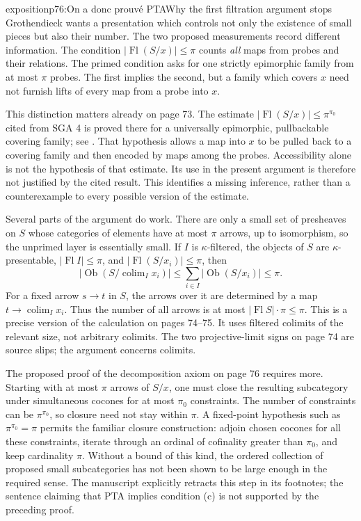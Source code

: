 \begin{dcomment}{exposition}{p76:On a donc prouvé PTA}{Why the first filtration argument stops}
Grothendieck wants a presentation which controls not only the existence of small pieces but also their number.  The two proposed measurements record different information.  The condition $|\operatorname{Fl}(S/x)|\leq\pi$ counts \emph{all} maps from probes and their relations.  The primed condition asks for one strictly epimorphic family from at most $\pi$ probes.  The first implies the second, but a family which covers $x$ need not furnish lifts of every map from a probe into $x$.

This distinction matters already on page 73.  The estimate $|\operatorname{Fl}(S/x)|\leq\pi^{\pi_0}$ cited from SGA 4 is proved there for a universally epimorphic, pullbackable covering family; see \citet[Expos\'e I, Proposition 7.6 and Proposition 9.13]{SGA4I1972}.  That hypothesis allows a map into $x$ to be pulled back to a covering family and then encoded by maps among the probes.  Accessibility alone is not the hypothesis of that estimate.  Its use in the present argument is therefore not justified by the cited result.  This identifies a missing inference, rather than a counterexample to every possible version of the estimate.

Several parts of the argument do work.  There are only a small set of presheaves on $S$ whose categories of elements have at most $\pi$ arrows, up to isomorphism, so the unprimed layer is essentially small.  If $I$ is $\kappa$-filtered, the objects of $S$ are $\kappa$-presentable, $|\operatorname{Fl}I|\leq\pi$, and $|\operatorname{Fl}(S/x_i)|\leq\pi$, then
\[
 |\operatorname{Ob}(S/\operatorname{colim}_I x_i)|
 \leq\sum_{i\in I}|\operatorname{Ob}(S/x_i)|\leq\pi.
\]
For a fixed arrow $s\to t$ in $S$, the arrows over it are determined by a map $t\to\operatorname{colim}_I x_i$.  Thus the number of all arrows is at most $|\operatorname{Fl}S|\cdot\pi\leq\pi$.  This is a precise version of the calculation on pages 74--75.  It uses filtered colimits of the relevant size, not arbitrary colimits.  The two projective-limit signs on page 74 are source slips; the argument concerns colimits.

The proposed proof of the decomposition axiom on page 76 requires more.  Starting with at most $\pi$ arrows of $S/x$, one must close the resulting subcategory under simultaneous cocones for at most $\pi_0$ constraints.  The number of constraints can be $\pi^{\pi_0}$, so closure need not stay within $\pi$.  A fixed-point hypothesis such as $\pi^{\pi_0}=\pi$ permits the familiar closure construction: adjoin chosen cocones for all these constraints, iterate through an ordinal of cofinality greater than $\pi_0$, and keep cardinality $\pi$.  Without a bound of this kind, the ordered collection of proposed small subcategories has not been shown to be large enough in the required sense.  The manuscript explicitly retracts this step in its footnotes; the sentence claiming that PTA implies condition (c) is not supported by the preceding proof.


\end{dcomment}
